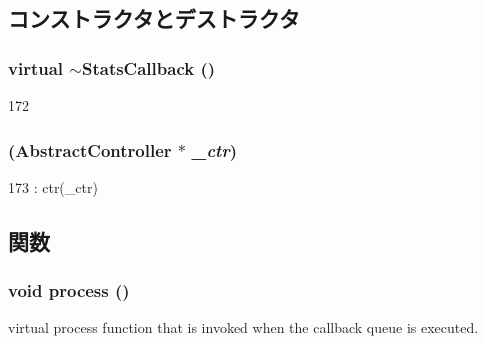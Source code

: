 \subsection{コンストラクタとデストラクタ}
\hypertarget{classAbstractController_1_1StatsCallback_af912e043410ed023ceb7b6eacf42a794}{
\subsubsection[{$\sim$StatsCallback}]{\setlength{\rightskip}{0pt plus 5cm}virtual $\sim${\bf StatsCallback} ()}}
\label{classAbstractController_1_1StatsCallback_af912e043410ed023ceb7b6eacf42a794}



\begin{DoxyCode}
172 {}
\end{DoxyCode}
\hypertarget{classAbstractController_1_1StatsCallback_a21a0491ed8c247edae7783371356ec5d}{
\subsubsection[{StatsCallback}]{ ({\bf AbstractController} $\ast$ {\em \_\-ctr})}}
\label{classAbstractController_1_1StatsCallback_a21a0491ed8c247edae7783371356ec5d}



\begin{DoxyCode}
173 : ctr(_ctr) {}
\end{DoxyCode}


\subsection{関数}
\hypertarget{classAbstractController_1_1StatsCallback_a2e9c5136d19b1a95fc427e0852deab5c}{
\subsubsection[{process}]{\setlength{\rightskip}{0pt plus 5cm}void process ()}}
\label{classAbstractController_1_1StatsCallback_a2e9c5136d19b1a95fc427e0852deab5c}
virtual process function that is invoked when the callback queue is executed. 

